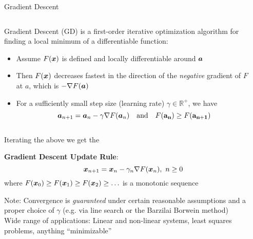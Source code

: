 \begin{frame}{Gradient Descent}
    \begin{columns}[onlytextwidth]
        \begin{column}{0.65\textwidth}
            Gradient Descent (GD) is a first-order iterative optimization algorithm for finding a
            local minimum of a differentiable function:
            \begin{itemize}
                \item Assume $F(\bm{x})$ is defined and locally differentiable around $\bm{a}$
                \item Then $F(\bm{x})$ decreases fastest in the direction
                      of the \emph{negative} gradient of $F$ at $a$, which is $-\nabla F(\bm{a})$
                \item For a sufficiently small step size (learning rate) $\gamma \in \mathbb{R}^+$,
                      we have
                      $$
                          \bm{a}_{n+1}=\bm{a}_{n}-\gamma \nabla F(\bm{a}_{n})
                          \quad \text{and} \quad F(\mathbf{a_{n}} )\geq F(\mathbf{a_{n+1}})
                      $$
            \end{itemize}
        \end{column}
        \begin{column}{0.35\textwidth}
            \begin{flushright}
                
            \end{flushright}
        \end{column}
    \end{columns}

    Iterating the above we get the
    \begin{boxed}
        \textbf{Gradient Descent Update Rule}:
        $$
            \bm{x}_{n+1}=\bm{x}_n-\gamma_n \nabla F(\bm{x}_n),\ n \ge 0
        $$
        where $F(\bm{x}_0)\ge F(\bm{x}_1)\ge F(\bm{x}_2)\ge \ldots$ is a monotonic sequence
    \end{boxed}

\end{frame}

\begin{frame}
    Note: Convergence is \emph{guaranteed} under certain reasonable assumptions and
    a proper choice of $\gamma$ (e.g. via line search or the Barzilai Borwein method)\\[5mm]

    Wide range of applications: Linear and non-linear systems, least squares problems, anything ``minimizable''
\end{frame}

